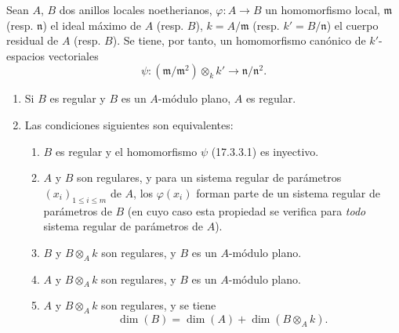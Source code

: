 \begin{proposition}[17.3.3]
\label{0.17.3.3-fr}
Sean $A$, $B$ dos anillos locales noetherianos,
$\varphi:A\longrightarrow B$ un homomorfismo local, $\mathfrak{m}$ \textup{(resp.
$\mathfrak{n}$)} el ideal máximo de $A$ \textup{(resp. $B$)},
$k=A/\mathfrak{m}$ \textup{(resp. $k'=B/\mathfrak{n}$)} el cuerpo residual de $A$
\textup{(resp. $B$)}. Se tiene, por tanto, un homomorfismo canónico de $k'$-espacios
vectoriales
\begin{equation}
\label{0.17.3.3.1-fr}
\tag{17.3.3.1}
  \psi:(\mathfrak{m}/\mathfrak{m}^2)\otimes_k k'
  \longrightarrow\mathfrak{n}/\mathfrak{n}^2.
\end{equation}
\begin{enumerate}
  \item[\rm (i)] Si $B$ es regular y $B$ es un $A$-módulo plano, $A$ es
  regular.
  \item[\rm (ii)] Las condiciones siguientes son equivalentes:
  \begin{enumerate}
    \item[\textit{a)}] $B$ es regular y el homomorfismo $\psi$ \textup{(17.3.3.1)} es
    inyectivo.
    \item[\textit{b)}] $A$ y $B$ son regulares, y para un sistema regular de
    parámetros $(x_i)_{1\leq i\leq m}$ de $A$, los $\varphi(x_i)$ forman parte
    de un sistema regular de parámetros de $B$ \textup{(en cuyo caso esta propiedad se
    verifica para \emph{todo} sistema regular de parámetros de $A$)}.
    \item[\textit{c)}] $B$ y $B\otimes_A k$ son regulares, y $B$ es un $A$-módulo
    plano.
    \item[\textit{d)}] $A$ y $B\otimes_A k$ son regulares, y $B$ es un $A$-módulo
    plano.
    \item[\textit{e)}] $A$ y $B\otimes_A k$ son regulares, y se tiene
    \begin{equation}
    \label{0.17.3.3.2-fr}
    \tag{17.3.3.2}
      \dim(B)=\dim(A)+\dim(B\otimes_A k).
    \end{equation}
  \end{enumerate}
\end{enumerate}
\end{proposition}


